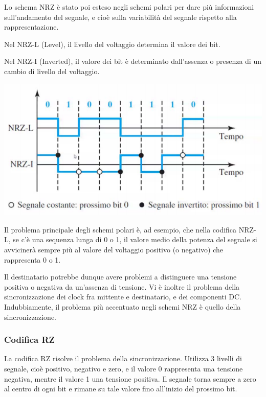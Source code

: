             Lo schema NRZ è stato poi esteso negli schemi polari per dare più informazioni sull'andamento del segnale, e cioè sulla variabilità del segnale rispetto alla rappresentazione.
            
            \vspace{3mm}
            
            Nel NRZ-L (Level), il livello del voltaggio determina il valore dei bit.
            
            Nel NRZ-I (Inverted), il valore dei bit è determinato dall'assenza o presenza di un cambio di livello del voltaggio.
            
            \begin{center}
                \includegraphics[scale=0.5]{images/NRZ-LeI.png}
            \end{center}
        
            Il problema principale degli schemi polari è, ad esempio, che nella codifica NRZ-L, se c'è una sequenza lunga di 0 o 1, il valore medio della potenza del segnale si avvicinerà sempre più al valore del voltaggio positivo (o negativo) che rappresenta 0 o 1. 
            
            Il destinatario potrebbe dunque avere problemi a distinguere una tensione positiva o negativa da un'assenza di tensione. Vi è inoltre il problema della sincronizzazione dei clock fra mittente e destinatario, e dei componenti DC. Indubbiamente, il problema più accentuato negli schemi NRZ è quello della sincronizzazione.
        
        \subsubsection{Codifica RZ}
        
            La codifica RZ risolve il problema della sincronizzazione. Utilizza 3 livelli di segnale, cioè positivo, negativo e zero, e il valore 0 rappresenta una tensione negativa, mentre il valore 1 una tensione positiva. Il segnale torna sempre a zero al centro di ogni bit e rimane su tale valore fino all'inizio del prossimo bit.
            
